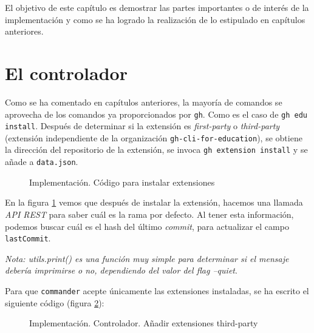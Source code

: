 El objetivo de este capítulo es demostrar las partes importantes o de interés de la implementación y como se ha logrado la realización de lo estipulado en capítulos anteriores.

\section{El controlador}
Como se ha comentado en capítulos anteriores, la mayoría de comandos se aprovecha de los comandos ya proporcionados por \verb|gh|. Como es el caso de \verb|gh edu install|. Después de determinar si la extensión es \emph{first-party} o \emph{third-party} (extensión independiente de la organización \verb|gh-cli-for-education|), se obtiene la dirección del repositorio de la extensión, se invoca \verb|gh extension install| y se añade a \verb|data.json|.

\begin{figure}[H]
    \centering
    \caption{Implementación. Código para instalar extensiones}
    \label{fig:installCode}
\end{figure}

En la figura \ref{fig:installCode} vemos que después de instalar la extensión, hacemos una llamada \emph{API REST} para saber cuál es la rama por defecto. Al tener esta información, podemos buscar cuál es el \gls{hash} del último \emph{commit}, para actualizar el campo \verb|lastCommit|.

\emph{Nota: utils.print() es una función muy simple para determinar si el mensaje debería imprimirse o no, dependiendo del valor del flag --quiet}.

Para que \verb|commander| acepte únicamente las extensiones instaladas, se ha escrito el siguiente código (figura \ref{fig:addThirdParty}):

\begin{figure}[H]
    \centering
    \caption{Implementación. Controlador. Añadir extensiones third-party}
    \label{fig:addThirdParty}
\end{figure}

